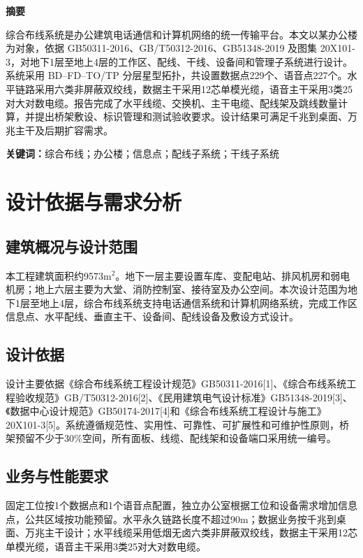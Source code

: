 \documentclass[UTF8,a4paper,12pt]{ctexart}
\newcommand{\bodypagestyle}{%
  \pagestyle{fancy}
  \fancyhf{}
  \fancyfoot[C]{\thepage}
  \renewcommand{\headrulewidth}{0pt}
}
\begin{document}


\clearpage
{}
\bodypagestyle

\begin{center}
  {\bfseries 摘要}
\end{center}

综合布线系统是办公建筑电话通信和计算机网络的统一传输平台。本文以某办公楼为对象，依据 GB50311-2016、GB/T50312-2016、GB51348-2019 及图集 20X101-3，对地下1层至地上4层的工作区、配线、干线、设备间和管理子系统进行设计。系统采用 BD--FD--TO/TP 分层星型拓扑，共设置数据点229个、语音点227个。水平链路采用六类非屏蔽双绞线，数据主干采用12芯单模光缆，语音主干采用3类25对大对数电缆。报告完成了水平线缆、交换机、主干电缆、配线架及跳线数量计算，并提出桥架敷设、标识管理和测试验收要求。设计结果可满足千兆到桌面、万兆主干及后期扩容需求。

\noindent\textbf{关键词：}综合布线；办公楼；信息点；配线子系统；干线子系统

\vspace{0.6cm}
\tableofcontents

\clearpage
{}
\setcounter{page}{1}

\section{设计依据与需求分析}

\subsection{建筑概况与设计范围}
本工程建筑面积约9573m$^2$。地下一层主要设置车库、变配电站、排风机房和弱电机房；地上六层主要为大堂、消防控制室、接待室及办公空间。本次设计范围为地下1层至地上4层，综合布线系统支持电话通信系统和计算机网络系统，完成工作区信息点、水平配线、垂直主干、设备间、配线设备及敷设方式设计。

\subsection{设计依据}
设计主要依据《综合布线系统工程设计规范》GB50311-2016[1]、《综合布线系统工程验收规范》GB/T50312-2016[2]、《民用建筑电气设计标准》GB51348-2019[3]、《数据中心设计规范》GB50174-2017[4]和《综合布线系统工程设计与施工》20X101-3[5]。系统遵循规范性、实用性、可靠性、可扩展性和可维护性原则，桥架预留不少于30\%空间，所有面板、线缆、配线架和设备端口采用统一编号。

\subsection{业务与性能要求}
固定工位按1个数据点和1个语音点配置，独立办公室根据工位和设备需求增加信息点，公共区域按功能预留。水平永久链路长度不超过90m；数据业务按千兆到桌面、万兆主干设计；水平线缆采用低烟无卤六类非屏蔽双绞线，数据主干采用12芯单模光缆，语音主干采用3类25对大对数电缆。
\end{document}
